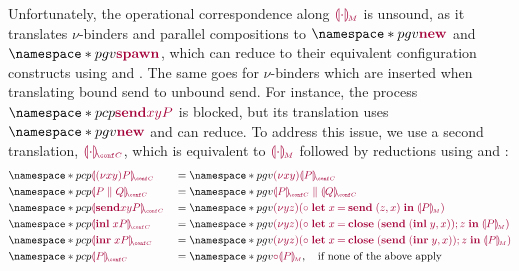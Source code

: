 \documentclass[main.tex]{subfiles}
\begin{document}
Unfortunately, the operational correspondence along $\tm{\cpgvM{\cdot}}$ is unsound, as it translates $\nu$-binders and parallel compositions to $\pgv{\tm{\new}}$ and $\pgv{\tm{\spawn}}$, which can reduce to their equivalent configuration constructs using  and . The same goes for $\nu$-binders which are inserted when translating bound send to unbound send. For instance, the process $\pcp{\tm{\send{x}{y}{P}}}$ is blocked, but its translation uses $\pgv{\tm{\new}}$ and can reduce. To address this issue, we use a second translation, $\tm{\cpgvC{\cdot}}$, which is equivalent to $\tm{\cpgvM{\cdot}}$ followed by reductions using  and :
\begin{align*}
  &\pcp{\tm{\cpgvC{\res{x}{y}{P}}}}
  &&= \pgv{\tm{\res{x}{y}{\cpgvC{P}}}}
  \\
  &\pcp{\tm{\cpgvC{\ppar{P}{Q}}}}
  &&= \pgv{\tm{\ppar{\cpgvC{P}}{\cpgvC{Q}}}}
  \\
  &\pcp{\tm{\cpgvC{\send{x}{y}{P}}}}
  &&= \pgv{\tm{\res{y}{z}{(\child\;\letbind{x}{\send\;\pair{z}{x}}{\cpgvM{P}})}}}
  \\
  &\pcp{\tm{\cpgvC{\inl{x}{P}}}}
  &&= \pgv{\tm{\res{y}{z}{(\child\;\letbind{x}{\andthen{\close\;(\send\;\pair{\inl{y}}{x})}{z}}{\cpgvM{P}})}}}
  \\
  &\pcp{\tm{\cpgvC{\inr{x}{P}}}}
  &&= \pgv{\tm{\res{y}{z}{(\child\;\letbind{x}{\andthen{\close\;(\send\;\pair{\inr{y}}{x})}{z}}{\cpgvM{P}})}}}
  \\
  &\pcp{\tm{\cpgvC{P}}}
  &&= \pgv{\tm{\child{\cpgvM{P}}}},\quad\text{if none of the above apply}
\end{align*}
\end{document}

